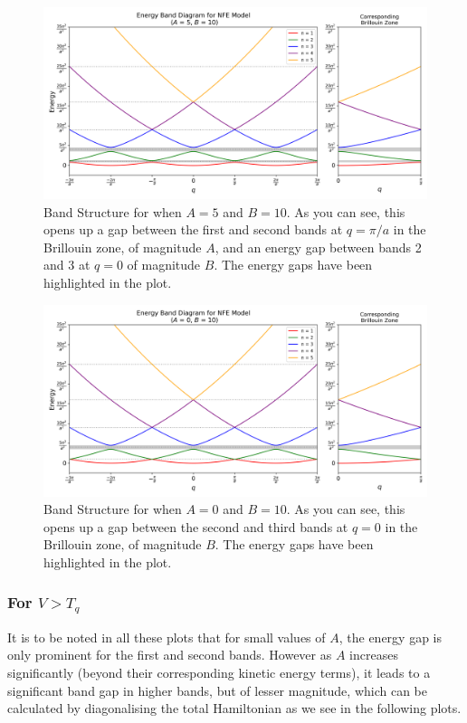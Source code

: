 \documentclass[12pt,a4paper]{article}
\begin{document}
\begin{figure}[H]
    \centering
    \includegraphics[width=1\linewidth]{images/5.png}
    \caption{Band Structure for when $A=5$ and $B=10$. As you can see, this opens up a gap between the first and second bands at $q=\pi/a$ in the Brillouin zone, of magnitude $A$, and an energy gap between bands 2 and 3 at $q=0$ of magnitude $B$. The energy gaps have been highlighted in the plot.}
    \label{5}
\end{figure}

\begin{figure}[H]
    \centering
    \includegraphics[width=1\linewidth]{images/6.png}
    \caption{Band Structure for when $A=0$ and $B=10$. As you can see, this opens up a gap between the second and third bands at $q=0$ in the Brillouin zone, of magnitude $B$. The energy gaps have been highlighted in the plot.}
    \label{6}
\end{figure}
\subsubsection{For $V > T_q$}

It is to be noted in all these plots that for small values of $A$, the energy gap is only prominent for the first and second bands. However as $A$ increases significantly (beyond their corresponding kinetic energy terms), it leads to a significant band gap in higher bands, but of lesser magnitude, which can be calculated by diagonalising the total Hamiltonian as we see in the following plots.
\end{document}
